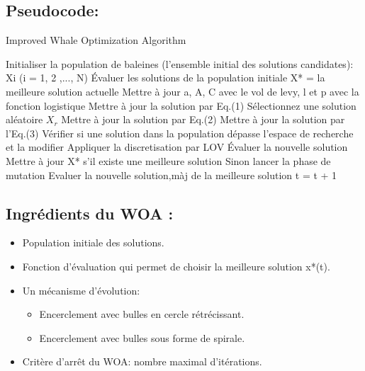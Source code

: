 \documentclass[12pt]{article}
\begin{document}
\subsection{Pseudocode:}
\begin{algorithm}[H]
    \caption{Improved Whale Optimization Algorithm}
    \begin{algorithmic}
        \STATE Initialiser la population de baleines (l'ensemble initial des solutions candidates): Xi (i = 1, 2 ,..., N)\;
        \STATE Évaluer les solutions de la population initiale\;
        \STATE X* = la meilleure solution actuelle\;
                \STATE Mettre à jour a, A, C avec le vol de levy, l et p avec la fonction logistique\;
                        \STATE Mettre à jour la solution par Eq.(1)\;
                    \ELSE
                        \STATE Sélectionnez une solution aléatoire \(X_r\)\;
                        \STATE Mettre à jour la solution par Eq.(2)\;
                    \ENDIF
                \ELSE 
                    \STATE Mettre à jour la solution par l'Eq.(3)\;
                \ENDIF
            \ENDFOR
            \STATE Vérifier si une solution dans la population dépasse l'espace de recherche et la modifier\;
            \STATE Appliquer la discretisation par LOV\;
            \STATE Évaluer la nouvelle solution\;
            \STATE Mettre à jour X* s'il existe une meilleure solution Sinon lancer la phase de mutation\;
            \STATE Evaluer la nouvelle solution,màj de la meilleure solution
            \STATE t = t + 1\;
        \ENDWHILE
    \end{algorithmic}
\end{algorithm}
\subsection{Ingrédients du WOA :}
\begin{itemize}
    \item Population initiale des solutions.
    \item Fonction d’évaluation qui permet de choisir la meilleure solution x*(t).
    \item Un mécanisme d'évolution:
    \begin{itemize}
        \item Encerclement avec bulles en cercle rétrécissant.
        \item Encerclement avec bulles sous forme de spirale.
    \end{itemize}
    \item Critère d'arrêt du WOA: nombre maximal d’itérations.    
\end{itemize}
\end{document}
